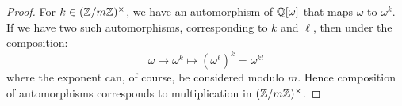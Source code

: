 \begin{proof}
    For $k \in (\mathbb{Z}/m\mathbb{Z})^\times$, we have an automorphism of $\mathbb{Q}[\omega]$ that maps $\omega$ to $\omega^k$. If we have two such automorphisms, corresponding to $k$ and $\ell$, then under the composition:
    \[ \omega \mapsto \omega^k \mapsto (\omega^\ell)^k = \omega^{kl} \]
    where the exponent can, of course, be considered modulo $m$. Hence composition of automorphisms corresponds to multiplication in $(\mathbb{Z}/m\mathbb{Z})^\times$.
\end{proof}
